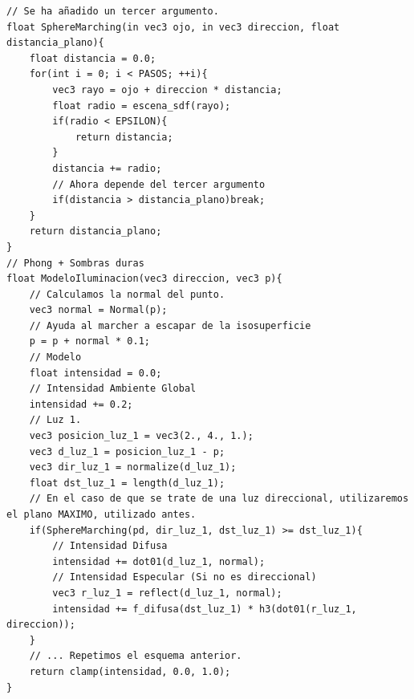 \newpage
\begin{lstlisting}
// Se ha añadido un tercer argumento.
float SphereMarching(in vec3 ojo, in vec3 direccion, float distancia_plano){
    float distancia = 0.0;
    for(int i = 0; i < PASOS; ++i){
        vec3 rayo = ojo + direccion * distancia;
        float radio = escena_sdf(rayo);
        if(radio < EPSILON){
            return distancia;
        }
        distancia += radio;
        // Ahora depende del tercer argumento
        if(distancia > distancia_plano)break;
    }
    return distancia_plano;
}
// Phong + Sombras duras
float ModeloIluminacion(vec3 direccion, vec3 p){
    // Calculamos la normal del punto.
    vec3 normal = Normal(p);
    // Ayuda al marcher a escapar de la isosuperficie
    p = p + normal * 0.1;
    // Modelo
    float intensidad = 0.0;
    // Intensidad Ambiente Global
    intensidad += 0.2;
    // Luz 1.
    vec3 posicion_luz_1 = vec3(2., 4., 1.);
    vec3 d_luz_1 = posicion_luz_1 - p;
    vec3 dir_luz_1 = normalize(d_luz_1);
    float dst_luz_1 = length(d_luz_1);
    // En el caso de que se trate de una luz direccional, utilizaremos el plano MAXIMO, utilizado antes.
    if(SphereMarching(pd, dir_luz_1, dst_luz_1) >= dst_luz_1){
        // Intensidad Difusa
        intensidad += dot01(d_luz_1, normal);
        // Intensidad Especular (Si no es direccional)
        vec3 r_luz_1 = reflect(d_luz_1, normal);
        intensidad += f_difusa(dst_luz_1) * h3(dot01(r_luz_1, direccion));
    }
    // ... Repetimos el esquema anterior.
    return clamp(intensidad, 0.0, 1.0);
}
\end{lstlisting}
\newpage
